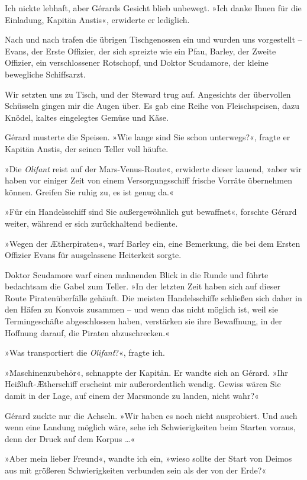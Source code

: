 Ich nickte lebhaft, aber Gérards Gesicht blieb unbewegt. »Ich danke
Ihnen für die Einladung, Kapitän Anstis«, erwiderte er lediglich.

Nach und nach trafen die übrigen Tischgenossen ein und wurden uns
vorgestellt – Evans, der Erste Offizier, der sich spreizte wie ein
Pfau, Barley, der Zweite Offizier, ein verschlossener Rotschopf,
und Doktor Scudamore, der kleine bewegliche Schiffsarzt.

Wir setzten uns zu Tisch, und der Steward trug auf. Angesichts der
übervollen Schüsseln gingen mir die Augen über. Es gab eine Reihe
von Fleischspeisen, dazu Knödel, kaltes eingelegtes Gemüse und
Käse.

Gérard musterte die Speisen. »Wie lange sind Sie schon unterwegs?«,
fragte er Kapitän Anstis, der seinen Teller voll häufte.

»Die \emph{Olifant} reist auf der Mars-Venus-Route«, erwiderte
dieser kauend, »aber wir haben vor einiger Zeit von einem
Versorgungsschiff frische Vorräte übernehmen können. Greifen Sie
ruhig zu, es ist genug da.«

»Für ein Handelsschiff sind Sie außergewöhnlich gut bewaffnet«,
forschte Gérard weiter, während er sich zurückhaltend bediente.

»Wegen der Ætherpiraten«, warf Barley ein, eine Bemerkung, die bei
dem Ersten Offizier Evans für ausgelassene Heiterkeit sorgte.

Doktor Scudamore warf einen mahnenden Blick in die Runde und führte
bedachtsam die Gabel zum Teller. »In der letzten Zeit haben sich
auf dieser Route Piratenüberfälle gehäuft. Die meisten
Handelsschiffe schließen sich daher in den Häfen zu Konvois
zusammen – und wenn das nicht möglich ist, weil sie Termingeschäfte
abgeschlossen haben, verstärken sie ihre Bewaffnung, in der
Hoffnung darauf, die Piraten abzuschrecken.«

»Was transportiert die \emph{Olifant}?«, fragte ich.

»Maschinenzubehör«, schnappte der Kapitän. Er wandte sich an
Gérard. »Ihr Heißluft-Ætherschiff erscheint mir außerordentlich
wendig. Gewiss wären Sie damit in der Lage, auf einem der Marsmonde
zu landen, nicht wahr?«

Gérard zuckte nur die Achseln. »Wir haben es noch nicht
ausprobiert. Und auch wenn eine Landung möglich wäre, sehe ich
Schwierigkeiten beim Starten voraus, denn der Druck auf dem Korpus
\ldots{}«

»Aber mein lieber Freund«, wandte ich ein, »wieso sollte der Start
von Deimos aus mit größeren Schwierigkeiten verbunden sein als der
von der Erde?«

